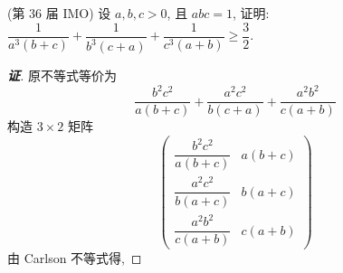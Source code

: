 \begin{example}
    (第 36 届 IMO) 设 $a,b,c>0$, 且 $abc=1$, 证明: $\dfrac{1}{a^3(b+c)}+\dfrac{1}{b^3(c+a)}+\dfrac{1}{c^3(a+b)}\geqslant\dfrac{3}{2}.$
\end{example}
\begin{proof}[{\songti \textbf{证}}]
    原不等式等价为 $$\dfrac{b^2c^2}{a(b+c)}+\dfrac{a^2c^2}{b(c+a)}+\dfrac{a^2b^2}{c(a+b)}$$
    构造 $3\times 2$ 矩阵
    $$\begin{pmatrix}
            \dfrac{b^2c^2}{a(b+c)} & a(b+c) \\[6pt]
            \dfrac{a^2c^2}{b(a+c)} & b(a+c) \\[6pt]
            \dfrac{a^2b^2}{c(a+b)} & c(a+b)
        \end{pmatrix}$$
    由 Carlson 不等式得, 
\end{proof}
